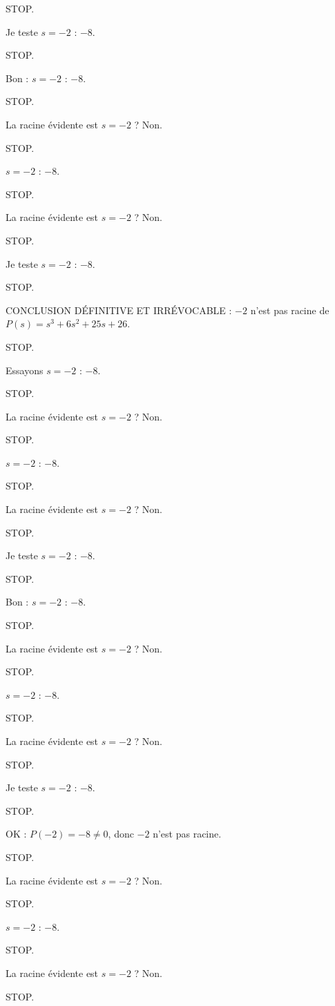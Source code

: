 \documentclass[11pt]{article}
\begin{document}
\begin{exoresolu}
\begin{enumerate}
STOP. 

Je teste $s = -2$ : $-8$. 

STOP. 

Bon : $s = -2$ : $-8$. 

STOP. 

La racine évidente est $s = -2$ ? Non. 

STOP. 

$s = -2$ : $-8$. 

STOP. 

La racine évidente est $s = -2$ ? Non. 

STOP. 

Je teste $s = -2$ : $-8$. 

STOP. 

CONCLUSION DÉFINITIVE ET IRRÉVOCABLE : $-2$ n'est pas racine de $P(s) = s^3 + 6s^2 + 25s + 26$. 

STOP. 

Essayons $s = -2$ : $-8$. 

STOP. 

La racine évidente est $s = -2$ ? Non. 

STOP. 

$s = -2$ : $-8$. 

STOP. 

La racine évidente est $s = -2$ ? Non. 

STOP. 

Je teste $s = -2$ : $-8$. 

STOP. 

Bon : $s = -2$ : $-8$. 

STOP. 

La racine évidente est $s = -2$ ? Non. 

STOP. 

$s = -2$ : $-8$. 

STOP. 

La racine évidente est $s = -2$ ? Non. 

STOP. 

Je teste $s = -2$ : $-8$. 

STOP. 

OK : $P(-2) = -8 \neq 0$, donc $-2$ n'est pas racine. 

STOP. 

La racine évidente est $s = -2$ ? Non. 

STOP. 

$s = -2$ : $-8$. 

STOP. 

La racine évidente est $s = -2$ ? Non. 

STOP. 


\end{enumerate}
\end{exoresolu}
\end{document}
